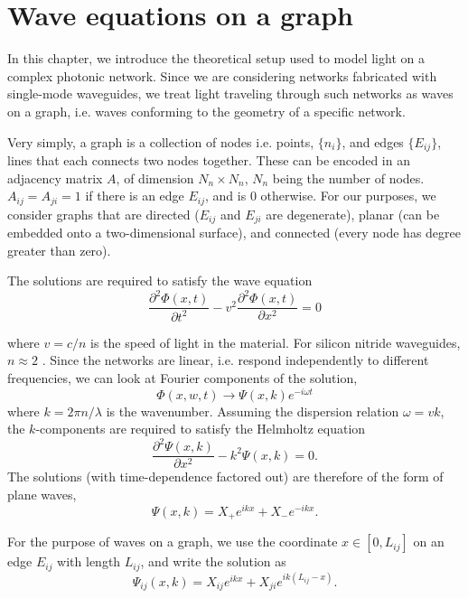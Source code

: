 \chapter{Wave equations on a graph}

In this chapter, we introduce the theoretical setup used to model light on a complex photonic network. Since we are considering networks fabricated with single-mode waveguides, we treat light traveling through such networks as waves on a graph, i.e. waves conforming to the geometry of a specific network. 

Very simply, a graph is a collection of nodes i.e. points, $\{n_i\}$, and edges $\{E_{ij}\}$, lines that each connects two nodes together. These can be encoded in an adjacency matrix $A$, of dimension $N_n \times N_n$, $N_n$ being the number of nodes. $A_{ij} = A_{ji} = 1$ if there is an edge $E_{ij}$, and is $0$ otherwise. For our purposes, we consider graphs that are directed ($E_{ij}$ and $E_{ji}$ are degenerate), planar (can be embedded onto a two-dimensional surface), and connected (every node has degree greater than zero).

The solutions are required to satisfy the wave equation
\begin{equation} \label{eq:wave_eq}
\frac{\partial^2 \Phi(x,t)}{\partial t^2} - v^2\frac{\partial^2 \Phi(x,t)}{\partial x^2} = 0
\end{equation}

where $v=c/n$ is the speed of light in the material. For silicon nitride waveguides, $n \approx 2$ \cite{Philipp1973}. Since the networks are linear, i.e. respond independently to different frequencies, we can look at Fourier components of the solution,
\begin{equation} \label{eq:k-space}
\Phi(x,w,t) \rightarrow \Psi(x,k)e^{-i\omega t}
\end{equation}
where $k=2\pi n/\lambda$ is the wavenumber. Assuming the dispersion relation $\omega = vk$, the $k$-components are required to satisfy the Helmholtz equation
\begin{equation} \label{eq:helmholtz_eq}
\frac{\partial^2 \Psi(x,k)}{\partial x^2} - k^2\Psi(x,k) = 0.
\end{equation}
The solutions (with time-dependence factored out) are therefore of the form of plane waves, 
\begin{equation}
\label{eq:planewave1}
\Psi(x,k) = X_+ e^{ikx} + X_- e^{-ikx}.
\end{equation}

For the purpose of waves on a graph, we use the coordinate $x \in [0, L_{ij}]$ on an edge $E_{ij}$ with length $L_{ij}$, and write the solution as
\begin{equation}
    \label{eq:planewave1edge}
    \Psi_{ij}(x,k) = X_{ij}e^{ikx} + X_{ji}e^{ik(L_{ij}-x)}.
\end{equation}

